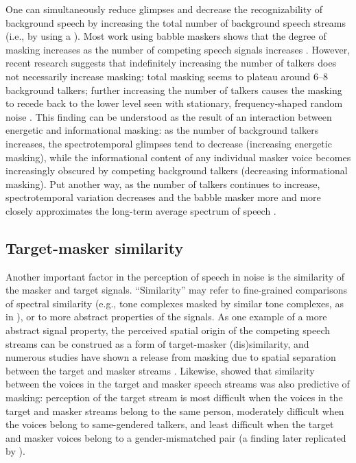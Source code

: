 One can simultaneously reduce glimpses and decrease the recognizability of background speech by increasing the total number of background speech streams (i.e., by using a ).  Most work using babble maskers shows that the degree of masking increases as the number of competing speech signals increases \citep[e.g.,][]{Miller1947, BrungartEtAl2001}.  However, recent research suggests that indefinitely increasing the number of talkers does not necessarily increase masking: total masking seems to plateau around 6–8 background talkers; further increasing the number of talkers causes the masking to recede back to the lower level seen with stationary, frequency-shaped random noise \citep{SimpsonCooke2005}.  This finding can be understood as the result of an interaction between energetic and informational masking: as the number of background talkers increases, the spectrotemporal glimpses tend to decrease (increasing energetic masking), while the informational content of any individual masker voice becomes increasingly obscured by competing background talkers (decreasing informational masking).  Put another way, as the number of talkers continues to increase, spectrotemporal variation decreases and the babble masker more and more closely approximates the long-term average spectrum of speech \citep{SimpsonCooke2005}.

\subsection{Target-masker similarity\label{sec:similarity}}
Another important factor in the perception of speech in noise is the similarity of the masker and target signals.  “Similarity” may refer to fine-grained comparisons of spectral similarity (e.g., tone complexes masked by similar tone complexes, as in \citealt{LeeRichards2011}), or to more abstract properties of the signals.\footnotemark{}  As one example of a more abstract signal property, the perceived spatial origin of the competing speech streams can be construed as a form of target-masker (dis)similarity, and numerous studies have shown a release from masking due to spatial separation between the target and masker streams \citep[e.g.,][]{FreymanEtAl1999, BrungartSimpson2002, FreymanEtAl2004, GallunEtAl2005, KiddEtAl2005a, JohnstoneLitovsky2006}.  Likewise, \citet{Brungart2001} showed that similarity between the voices in the target and masker speech streams was also predictive of masking: perception of the target stream is most difficult when the voices in the target and masker streams belong to the same person, moderately difficult when the voices belong to same-gendered talkers, and least difficult when the target and masker voices belong to a gender-mismatched pair (a finding later replicated by \citealt{HelferFreyman2008}).

